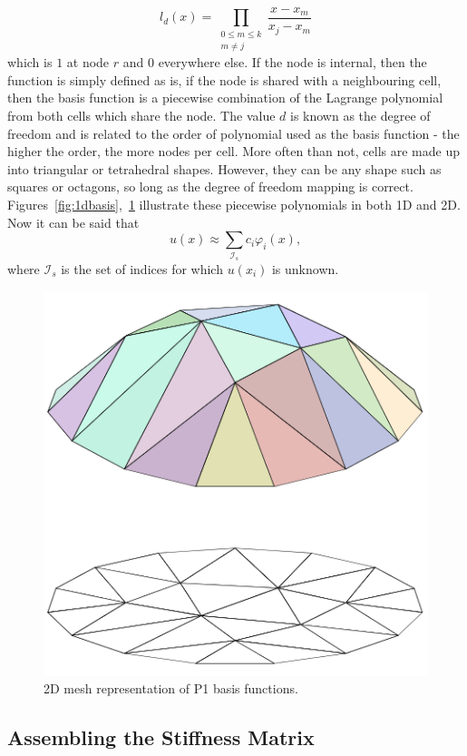 \begin{equation}
	l_d(x) = \prod_{\substack{0\leq m\leq k \\ m\neq j}}\frac{x-x_m}{x_j-x_m} 
\end{equation}
which is $1$ at node $r$ and $0$ everywhere else. If the node is internal, then the function is simply defined as is, if the node is shared with a neighbouring cell, then the basis function is a piecewise combination of the Lagrange polynomial from both cells which share the node. The value $d$ is known as the degree of freedom and is related to the order of polynomial used as the basis function - the higher the order, the more nodes per cell. More often than not, cells are made up into triangular or tetrahedral shapes. However, they can be any shape such as squares or octagons, so long as the degree of freedom mapping is correct. Figures~\ref{fig:1dbasis},~\ref{fig:2dbasis} illustrate these piecewise polynomials in both 1D and 2D. Now it can be said that
\begin{equation}\label{femapprox}
	u(x) \approx \sum_{\mathcal{I}_s} c_i \varphi_i(x),
\end{equation}
where $\mathcal{I}_s$ is the set of indices for which $u(x_i)$ is unknown.
\cite{strang}

\begin{figure}
	\centering
	\includegraphics[width=0.4\linewidth]{Figures/Piecewise_linear_function2D}
	\caption{2D mesh representation of P1 basis functions.}
	\label{fig:2dbasis}
\end{figure}

\subsection{Assembling the Stiffness Matrix}

